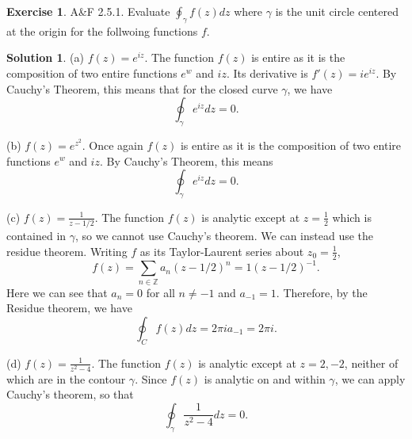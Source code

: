 \documentclass[12pt]{article}
\newcommand{\bbZ}{\mathbb{Z}}
\theoremstyle{definition}
\newtheorem{exer}{Exercise}
\newtheorem{sol}{Solution}
\theoremstyle{remark}
\begin{document}
\begin{exer}
    A\&F 2.5.1. Evaluate $\oint_\gamma f(z)dz$ where $\gamma$ is the unit circle centered at the origin for the follwoing functions $f$.
\end{exer}
\begin{sol}\leavevmode

    (a) $f(z) = e^{iz}$. The function $f(z)$ is entire as it is the composition of two entire functions $e^{w}$ and $iz$. Its derivative is $f'(z) = ie^{iz}$. By Cauchy's Theorem, this means that for the closed curve $\gamma$, we have
    \begin{equation}
        \oint_\gamma e^{iz}dz = 0.
    \end{equation} 

    (b) $f(z) = e^{z^2}$. Once again $f(z)$ is entire as it is the composition of two entire functions $e^{w}$ and $iz$. By Cauchy's Theorem, this means
    \begin{equation}
        \oint_\gamma e^{iz}dz = 0.
    \end{equation}

    (c) $f(z) = \frac{1}{z-1/2}$. The function $f(z)$ is analytic except at $z = \frac{1}{2}$ which is contained in $\gamma$, so we cannot use Cauchy's theorem. We can instead use the residue theorem. Writing $f$ as its Taylor-Laurent series about $z_0 = \frac{1}{2}$,
    \begin{equation}
        f(z) = \sum_{n\in\bbZ} a_n (z-1/2)^n = 1 (z - 1/2)^{-1}.
    \end{equation}
    Here we can see that $a_n = 0$ for all $n\neq -1$ and $a_{-1} = 1$. Therefore, by the Residue theorem, we have
    \begin{equation}
        \oint_C f(z) dz=  2\pi i a_{-1} = 2\pi i.
    \end{equation}

    (d) $f(z) = \frac{1}{z^2-4}$. The function $f(z)$ is analytic except at $z = 2, -2$, neither of which are in the contour $\gamma$. Since $f(z)$ is analytic on and within $\gamma$, we can apply Cauchy's theorem, so that
    \begin{equation}
        \oint_\gamma \frac{1}{z^2-4}dz = 0.
    \end{equation}


\end{sol}
\end{document}
